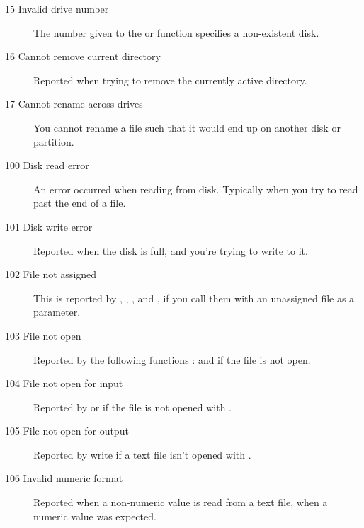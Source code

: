 \begin{description}
\item [15  Invalid drive number]
The number given to the  or  function specifies a 
non-existent disk.

\item [16  Cannot remove current directory]
Reported when trying to remove the currently active directory.

\item [17  Cannot rename across drives]
You cannot rename a file such that it would end up on another disk or
partition.

\item [100  Disk read error]
An error occurred when reading from disk. Typically when you try
to read past the end of a file.

\item [101  Disk write error]
Reported when the disk is full, and you're trying to write to it.

\item [102  File not assigned]
This is reported by , , , 
 and , if you call
them with an unassigned file as a parameter.

\item [103  File not open]
Reported by the following functions :  and  if the 
file is not open.

\item [104  File not open for input]
Reported by  or  if 
the file is not opened with .

\item [105  File not open for output]
Reported by write if a text file isn't opened with .

\item [106  Invalid numeric format]
Reported when a non-numeric value is read from a text file, when a numeric
value was expected.


\end{description}
